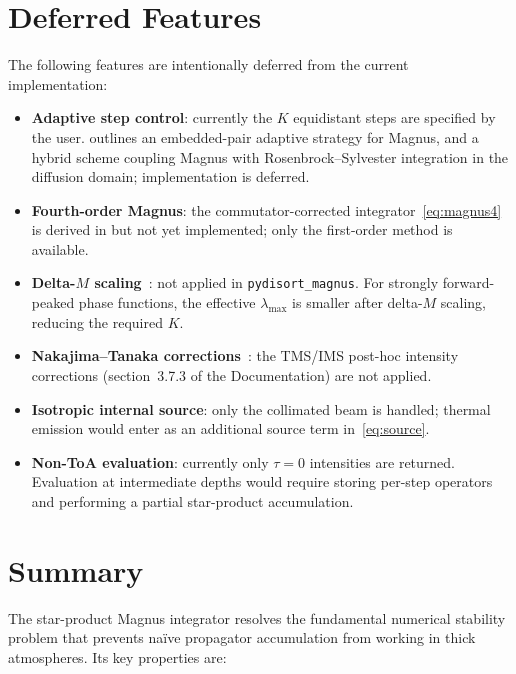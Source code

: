 \documentclass[11pt,a4paper]{article}
\theoremstyle{definition}
\begin{document}
\section{Deferred Features}\label{sec:deferred}

The following features are intentionally deferred from the current
implementation:
\begin{itemize}[nosep]
\item \textbf{Adaptive step control}: currently the $K$ equidistant
  steps are specified by the user.   outlines an
  embedded-pair adaptive strategy for Magnus, and a hybrid scheme
  coupling Magnus with Rosenbrock--Sylvester integration in the
  diffusion domain; implementation is deferred.
\item \textbf{Fourth-order Magnus}: the commutator-corrected
  integrator~\eqref{eq:magnus4} is derived in  but
  not yet implemented; only the first-order method is available.
\item \textbf{Delta-$M$ scaling}~\cite{wiscombe1977}: not applied in
  \texttt{pydisort\_magnus}.  For strongly forward-peaked phase
  functions, the effective $\lambda_{\max}$ is smaller after delta-$M$
  scaling, reducing the required $K$.
\item \textbf{Nakajima--Tanaka corrections}~\cite{NT1988}: the TMS/IMS
  post-hoc intensity corrections (section~3.7.3 of the Documentation)
  are not applied.
\item \textbf{Isotropic internal source}: only the collimated beam is
  handled; thermal emission would enter as an additional source term
  in~\eqref{eq:source}.
\item \textbf{Non-ToA evaluation}: currently only $\tau\!=\!0$
  intensities are returned.  Evaluation at intermediate depths would
  require storing per-step operators and performing a partial
  star-product accumulation.
\end{itemize}


\section{Summary}\label{sec:summary}

The star-product Magnus integrator resolves the fundamental numerical
stability problem that prevents na\"ive propagator accumulation from
working in thick atmospheres.  Its key properties are:
\end{document}
